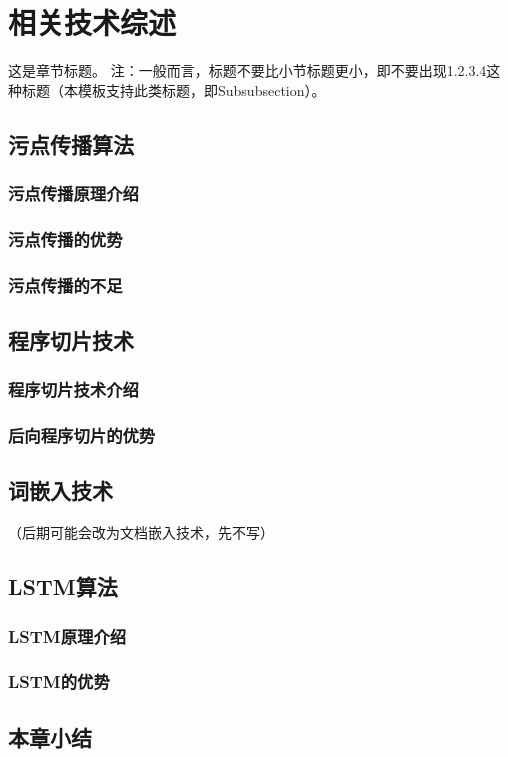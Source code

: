 \chapter{相关技术综述}

这是章节标题。
注：一般而言，标题不要比小节标题更小，即不要出现1.2.3.4这种标题（本模板支持此类标题，即Subsubsection）。

\section{污点传播算法}

\subsection{污点传播原理介绍}

\subsection{污点传播的优势}

\subsection{污点传播的不足}

\section{程序切片技术}
\subsection{程序切片技术介绍}

\subsection{后向程序切片的优势}

\section{词嵌入技术}
（后期可能会改为文档嵌入技术，先不写）

\section{LSTM算法}
\subsection{LSTM原理介绍}
\subsection{LSTM的优势}

\section{本章小结}